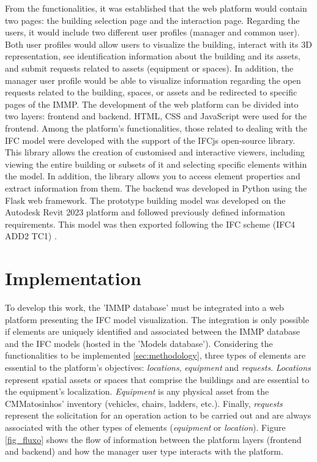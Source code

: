\documentclass[a4paper, 10pt, twocolumn, twoside]{article}
\begin{document}
From the functionalities, it was established that the web platform would contain two pages: the building selection page and the interaction page. Regarding the users, it would include two different user profiles (manager and common user). Both user profiles would allow users to visualize the building, interact with its 3D representation, see identification information about the building and its assets, and submit requests related to assets (equipment or spaces). In addition, the manager user profile would be able to visualize information regarding the open requests related to the building, spaces, or assets and be redirected to specific pages of the IMMP. The development of the web platform can be divided into two layers: frontend and backend. HTML, CSS and JavaScript were used for the frontend. Among the platform's functionalities, those related to dealing with the IFC model were developed with the support of the IFCjs open-source library. This library allows the creation of customised and interactive viewers, including viewing the entire building or subsets of it and selecting specific elements within the model. In addition, the library allows you to access element properties and extract information from them. The backend was developed in Python using the Flask web framework. The prototype building model was developed on the Autodesk Revit 2023 platform and followed previously defined information requirements. This model was then exported following the IFC scheme (IFC4 ADD2 TC1) \cite{BuildingSMARTa}.

\section{Implementation}
\label{sec:implementation}

To develop this work, the 'IMMP database' must be integrated into a web platform presenting the IFC model visualization. The integration is only possible if elements are uniquely identified and associated between the IMMP database and the IFC models (hosted in the 'Models database'). Considering the functionalities to be implemented \ref{sec:methodology}, three types of elements are essential to the platform's objectives: \emph{locations}, \emph{equipment} and \emph{requests}. \emph{Locations} represent spatial assets or spaces that comprise the buildings and are essential to the equipment's localization. \emph{Equipment} is any physical asset from the CMMatosinhos' inventory (vehicles, chairs, ladders, etc.). Finally, \emph{requests} represent the solicitation for an operation action to be carried out and are always associated with the other types of elements (\emph{equipment} or \emph{location}). Figure \ref{fig_fluxo} shows the flow of information between the platform layers (frontend and backend) and how the manager user type interacts with the platform.
\end{document}
